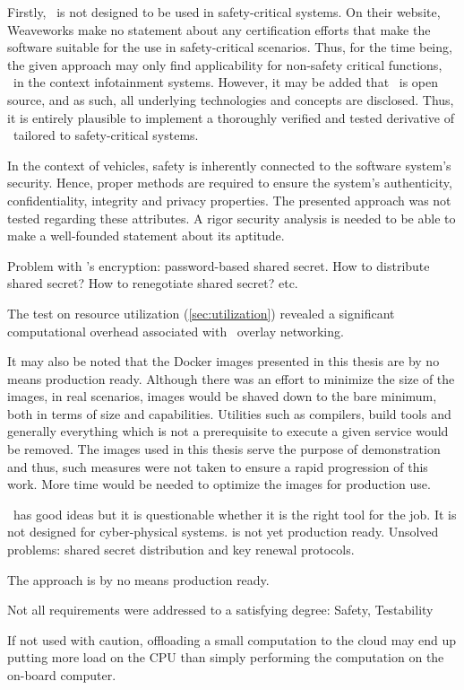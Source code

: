 Firstly, \wnet\ is not designed to be used in safety-critical systems. On their website, Weaveworks make no statement about any certification efforts that make the software suitable for the use in safety-critical scenarios. Thus, for the time being, the given approach may only find applicability for non-safety critical functions, \eg\ in the context infotainment systems. However, it may be added that \wnet\ is open source, and as such, all underlying technologies and concepts are disclosed. Thus, it is entirely plausible to implement a thoroughly verified and tested derivative of \wnet\ tailored to safety-critical systems.

In the context of vehicles, safety is inherently connected to the software system's security. Hence, proper methods are required to ensure the system's authenticity, confidentiality, integrity and privacy properties. The presented approach was not tested regarding these attributes. A rigor security analysis is needed to be able to make a well-founded statement about its aptitude.

Problem with \wnet 's encryption: password-based shared secret. How to distribute shared secret? How to renegotiate shared secret? etc.

The test on resource utilization (\cf \autoref{sec:utilization}) revealed a significant computational overhead associated with \wnet\ overlay networking. 

It may also be noted that the Docker images presented in this thesis are by no means production ready. Although there was an effort to minimize the size of the images, in real scenarios, images would be shaved down to the bare minimum, both in terms of size and capabilities. Utilities such as compilers, build tools and generally everything which is not a prerequisite to execute a given service would be removed. The images used in this thesis serve the purpose of demonstration and thus, such measures were not taken to ensure a rapid progression of this work. More time would be needed to optimize the images for production use.



\weave\ has good ideas but it is questionable whether it is the right tool for the job. It is not designed for cyber-physical systems. is not yet production ready. Unsolved problems: shared secret distribution and key renewal protocols.


The approach is by no means production ready.


Not all requirements were addressed to a satisfying degree: Safety, Testability

If not used with caution, offloading a small computation to the cloud may end up putting more load on the CPU than simply performing the computation on the on-board computer.


